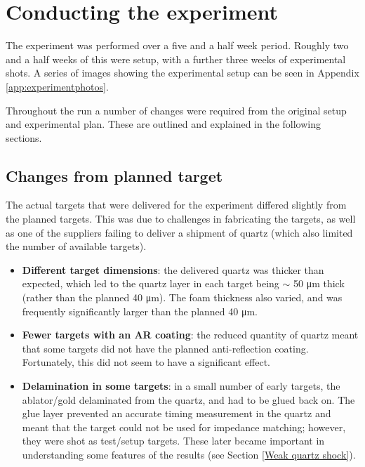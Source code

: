 
\section{Conducting the experiment}\label{sec:conducting-the-experiment}

The experiment was performed over a five and a half week period. Roughly two and a half weeks of this were setup, with a further three weeks of experimental shots. A series of images showing the experimental setup can be seen in Appendix \ref{app:experimentphotos}.

Throughout the run a number of changes were required from the original setup and experimental plan. These are outlined and explained in the following sections.

\subsection{Changes from planned target} \label{Target issues}
The actual targets that were delivered for the experiment differed slightly from the planned targets. This was due to challenges in fabricating the targets, as well as one of the suppliers failing to deliver a shipment of quartz (which also limited the number of available targets).
\begin{itemize}
    \item \textbf{Different target dimensions}: the delivered quartz was thicker than expected, which led to the quartz layer in each target being $\sim$ 50 \unit{\micro\meter} thick (rather than the planned 40 \unit{\micro\meter}). The foam thickness also varied, and was frequently significantly larger than the planned 40 \unit{\micro\meter}.
    \item \textbf{Fewer targets with an AR coating}: the reduced quantity of quartz meant that some targets did not have the planned anti-reflection coating. Fortunately, this did not seem to have a significant effect.
    \item \textbf{Delamination in some targets}: in a small number of early targets, the ablator/gold delaminated from the quartz, and had to be glued back on. The glue layer prevented an accurate timing measurement in the quartz and meant that the target could not be used for impedance matching; however, they were shot as test/setup targets. These later became important in understanding some features of the results (see Section \ref{Weak quartz shock}).
\end{itemize}

